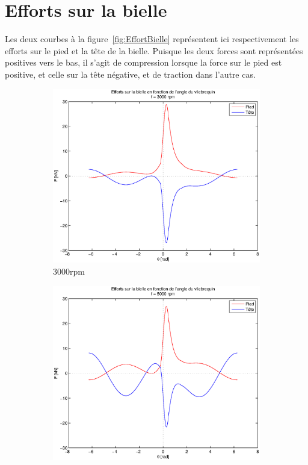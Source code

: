 \documentclass{article}
\begin{document}
\section{Efforts sur la bielle}

Les deux courbes à la figure~\ref{fig:EffortBielle} représentent ici respectivement les efforts sur le pied et la tête de la bielle. Puisque les deux forces sont représentées positives vers le bas, il s'agit de compression lorsque la force sur le pied est positive, et celle sur la tête négative, et de traction dans l'autre cas. 

\begin{figure}[h]
    \begin{subfigure}[h]{0.45\textwidth}
    				\includegraphics[scale=0.5]{Schema/forces_3000rpm.eps}
                \caption{\unit{3000}{rpm}}
                \label{fig:forces_3000rpm}
    \end{subfigure}
    \qquad
    \begin{subfigure}[h]{0.45\textwidth}
        			\includegraphics[scale=0.5]{Schema/forces_5000rpm.eps}

\end{subfigure}
\end{figure}
\end{document}
